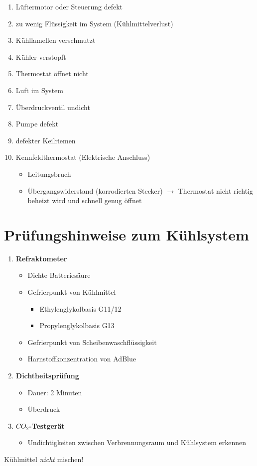 \begin{enumerate}
\item
  Lüftermotor oder Steuerung defekt
\item
  zu wenig Flüssigkeit im System (Kühlmittelverlust)
\item
  Kühllamellen verschmutzt
\item
  Kühler verstopft
\item
  Thermostat öffnet nicht
\item
  Luft im System
\item
  Überdruckventil undicht
\item
  Pumpe defekt
\item
  defekter Keilriemen
\item
  Kennfeldthermostat (Elektrische Anschluss)

  \begin{itemize}
  \item
    Leitungsbruch
  \item
    Übergangswiderstand (korrodierten Stecker) $\to$ Thermostat nicht
    richtig beheizt wird und schnell genug öffnet
  \end{itemize}
\end{enumerate}

\section{Prüfungshinweise zum
Kühlsystem}\label{pruefungshinweise-zum-kuehlsystem}

\begin{enumerate}
\item
  \textbf{Refraktometer}

  \begin{itemize}
  \item
    Dichte Batteriesäure
  \item
    Gefrierpunkt von Kühlmittel

    \begin{itemize}
    \item
      Ethylenglykolbasis G11/12
    \item
      Propylenglykolbasis G13
    \end{itemize}
  \item
    Gefrierpunkt von Scheibenwaschflüssigkeit
  \item
    Harnstoffkonzentration von AdBlue
  \end{itemize}
\item
  \textbf{Dichtheitsprüfung}

  \begin{itemize}
  \item
    Dauer: 2 Minuten
  \item
    Überdruck
  \end{itemize}
\item
  \textbf{$CO_2$-Testgerät}

  \begin{itemize}
  \item
    Undichtigkeiten zwischen Verbrennungsraum und Kühlsystem erkennen
  \end{itemize}
\end{enumerate}

Kühlmittel \emph{nicht} mischen!
